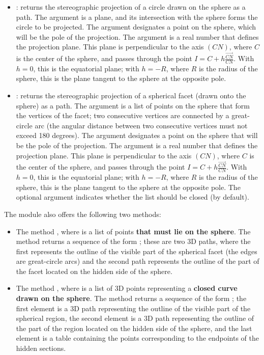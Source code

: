 \begin{itemize}
    \item {}: returns the stereographic projection of a circle drawn on the sphere as a path. The argument  is a plane, and its intersection with the sphere forms the circle to be projected. The argument  designates a point on the sphere, which will be the pole of the projection. The argument  is a real number that defines the projection plane. This plane is perpendicular to the axis $(CN)$, where $C$ is the center of the sphere, and passes through the point $I=C+h \frac{\vec{CN}}{CN}$. With $h=0$, this is the equatorial plane; with $h=-R$, where $R$ is the radius of the sphere, this is the plane tangent to the sphere at the opposite pole.
    
    \item {}: returns the stereographic projection of a spherical facet (drawn onto the sphere) as a path. The argument  is a list of points on the sphere that form the vertices of the facet; two consecutive vertices are connected by a great-circle arc (the angular distance between two consecutive vertices must not exceed 180 degrees). The argument  designates a point on the sphere that will be the pole of the projection. The argument  is a real number that defines the projection plane. This plane is perpendicular to the axis $(CN)$, where $C$ is the center of the sphere, and passes through the point $I=C+h \frac{\vec{CN}}{CN}$. With $h=0$, this is the equatorial plane; with $h=-R$, where $R$ is the radius of the sphere, this is the plane tangent to the sphere at the opposite pole. The optional argument  indicates whether the list  should be closed (\true by default).    
\end{itemize}

The module also offers the following two methods:

\begin{itemize}
    \item The method , where  is a list of points \textbf{that must lie on the sphere}. The method returns a sequence of the form ; these are two 3D paths, where the first represents the outline of the visible part of the spherical facet (the edges are great-circle arcs) and the second path represents the outline of the part of the facet located on the hidden side of the sphere. 

    \item The method , where  is a list of 3D points representing a \textbf{closed curve drawn on the sphere}. The method returns a sequence of the form ; the first element is a 3D path representing the outline of the visible part of the spherical region, the second element is a 3D path representing the outline of the part of the region located on the hidden side of the sphere, and the last element is a table containing the points corresponding to the endpoints of the hidden sections.
\end{itemize}

